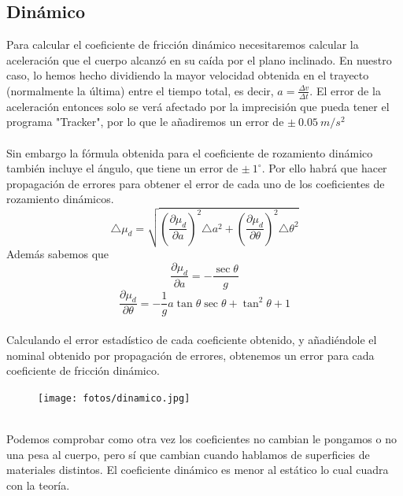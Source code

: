 \documentclass{article}
\begin{document}
    \subsection{Dinámico}
    Para calcular el coeficiente de fricción dinámico necesitaremos calcular la aceleración que el cuerpo alcanzó en su caída por el plano inclinado. En nuestro caso, lo hemos hecho dividiendo la mayor velocidad obtenida en el trayecto (normalmente la última) entre el tiempo total, es decir, $a = \frac{\Delta v}{\Delta t}$. El error de la aceleración entonces solo se verá afectado por la imprecisión que pueda tener el programa "Tracker", por lo que le añadiremos un error de $\pm \ 0.05\ m/s^2$ \\\\
    Sin embargo la fórmula obtenida para el coeficiente de rozamiento dinámico también incluye el ángulo, que tiene un error de $\pm \ 1^{\circ}$. Por ello habrá que hacer propagación de errores para obtener el error de cada uno de los coeficientes de rozamiento dinámicos.
    \[\triangle{\mu_d} = \sqrt{\left(\frac{\partial{\mu_d}}{\partial{a}}\right)^2 \triangle{a}^2 + \left(\frac{\partial{\mu_d}}{\partial{\theta}}\right)^2 \triangle{\theta}^2}\]
    Además sabemos que 
    \[\frac{\partial{\mu_d}}{\partial{a}} = -\frac{\sec{\theta}}{g}\]
    \[\frac{\partial{\mu_d}}{\partial{\theta}} = -\frac{1}{g}a \tan{\theta}\sec{\theta}+\tan^2{\theta} + 1\]\\
    
    Calculando el error estadístico de cada coeficiente obtenido, y añadiéndole el nominal obtenido por propagación de errores, obtenemos un error para cada coeficiente de fricción dinámico.
    \begin{figure}[h]
        \centering
        \texttt{[image: fotos/dinamico.jpg]}
    \end{figure}\\
    Podemos comprobar como otra vez los coeficientes no cambian le pongamos o no una pesa al cuerpo, pero sí que cambian cuando hablamos de superficies de materiales distintos. El coeficiente dinámico es menor al estático lo cual cuadra con la teoría.
    \clearpage
\end{document}

